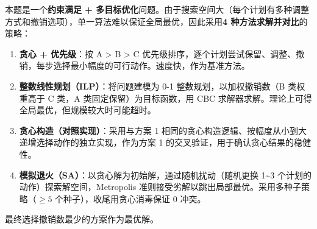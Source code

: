 
本题是一个\textbf{约束满足 + 多目标优化}问题。由于搜索空间大（每个计划有多种调整方式和撤销选项），单一算法难以保证全局最优，因此采用\textbf{4 种方法求解并对比}的策略：

\begin{enumerate}
    \item \textbf{贪心 + 优先级}：按 A > B > C 优先级排序，逐个计划尝试保留、调整、撤销，每步选择最小幅度的可行动作。速度快，作为基准方法。
    \item \textbf{整数线性规划（ILP）}：将问题建模为 0-1 整数规划，以加权撤销数（B 类权重高于 C 类，A 类固定保留）为目标函数，用 CBC 求解器求解。理论上可得全局最优，但规模较大时可能超时。
    \item \textbf{贪心构造（对照实现）}：采用与方案 1 相同的贪心构造逻辑、按幅度从小到大递增选择动作的独立实现，作为方案 1 的交叉验证，用于确认贪心结果的稳健性。
    \item \textbf{模拟退火（SA）}：以贪心解为初始解，通过随机扰动（随机更换 1\textasciitilde3 个计划的动作）探索解空间，Metropolis 准则接受劣解以跳出局部最优。采用多种子策略（$\geq 5$ 个种子），收尾用贪心消毒保证 0 冲突。
\end{enumerate}

最终选择撤销数最少的方案作为最优解。

